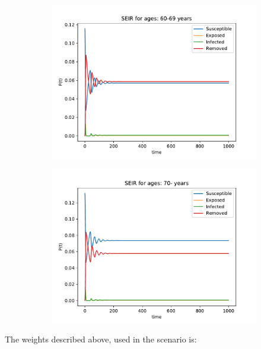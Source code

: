 \begin{figure}[H]
\begin{subfigure}{0.40\textwidth}
\includegraphics[width = \textwidth]{../fig/SEIR_60-69_n.pdf}
\caption{\protect}
\end{subfigure}
\begin{subfigure}{0.40\textwidth}
\includegraphics[width = \textwidth]{../fig/SEIR_70-_n.pdf}
\caption{\protect}
\end{subfigure}
\end{figure}


\newpage

The weights described above, used in the scenario is:
\begin{table}[H]
\centering

\end{table}

